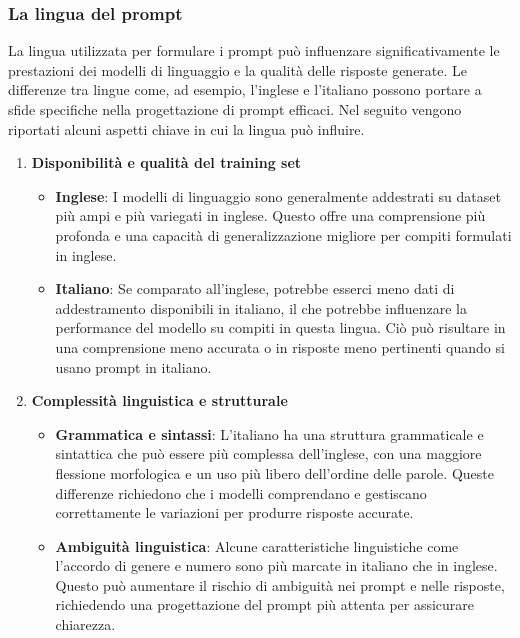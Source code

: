         \subsubsection{La lingua del prompt}
            La lingua utilizzata per formulare i prompt può influenzare significativamente le prestazioni dei modelli di linguaggio e la qualità delle risposte generate. Le differenze tra lingue come, ad esempio, l'inglese e l'italiano possono portare a sfide specifiche nella progettazione di prompt efficaci. Nel seguito vengono riportati alcuni aspetti chiave in cui la lingua può influire.
            \begin{enumerate}
                \item \textbf{Disponibilità e qualità del training set}
                \begin{itemize}
                    \item \textbf{Inglese}: I modelli di linguaggio sono generalmente addestrati su dataset più ampi e più variegati in inglese. Questo offre una comprensione più profonda e una capacità di generalizzazione migliore per compiti formulati in inglese.
                    
                    \item \textbf{Italiano}: Se comparato all'inglese, potrebbe esserci meno dati di addestramento disponibili in italiano, il che potrebbe influenzare la performance del modello su compiti in questa lingua. Ciò può risultare in una comprensione meno accurata o in risposte meno pertinenti quando si usano prompt in italiano.
                \end{itemize}
                
                \item \textbf{Complessità linguistica e strutturale }
                \begin{itemize}
                    \item \textbf{Grammatica e sintassi}: L'italiano ha una struttura grammaticale e sintattica che può essere più complessa dell'inglese, con una maggiore flessione morfologica e un uso più libero dell'ordine delle parole. Queste differenze richiedono che i modelli comprendano e gestiscano correttamente le variazioni per produrre risposte accurate.

                    \item \textbf{Ambiguità linguistica}: Alcune caratteristiche linguistiche come l'accordo di genere e numero sono più marcate in italiano che in inglese. Questo può aumentare il rischio di ambiguità nei prompt e nelle risposte, richiedendo una progettazione del prompt più attenta per assicurare chiarezza.
                \end{itemize}
                

\end{enumerate}
